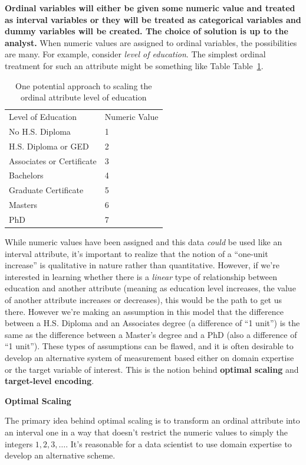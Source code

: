 \documentclass[
  letterpaper,
  DIV=11,
  numbers=noendperiod]{scrreprt}
\begin{document}
\textbf{Ordinal variables will either be given some numeric value and
treated as interval variables or they will be treated as categorical
variables and dummy variables will be created. The choice of solution is
up to the analyst.} When numeric values are assigned to ordinal
variables, the possibilities are many. For example, consider \emph{level
of education}. The simplest ordinal treatment for such an attribute
might be something like Table Table~\ref{tbl-educationint}.

\hypertarget{tbl-educationint}{}
\begin{longtable}[]{@{}ll@{}}
\caption{\label{tbl-educationint}One potential approach to scaling the
ordinal attribute level of education}\tabularnewline
\toprule()
\endhead
Level of Education & Numeric Value \\
No H.S. Diploma & 1 \\
H.S. Diploma or GED & 2 \\
Associates or Certificate & 3 \\
Bachelors & 4 \\
Graduate Certificate & 5 \\
Masters & 6 \\
PhD & 7 \\
\bottomrule()
\end{longtable}

While numeric values have been assigned and this data \emph{could} be
used like an interval attribute, it's important to realize that the
notion of a ``one-unit increase'' is qualitative in nature rather than
quantitative. However, if we're interested in learning whether there is
a \emph{linear} type of relationship between education and another
attribute (meaning as education level increases, the value of another
attribute increases or decreases), this would be the path to get us
there. However we're making an assumption in this model that the
difference between a H.S. Diploma and an Associates degree (a difference
of ``1 unit'') is the same as the difference between a Master's degree
and a PhD (also a difference of ``1 unit''). These types of assumptions
can be flawed, and it is often desirable to develop an alternative
system of measurement based either on domain expertise or the target
variable of interest. This is the notion behind \textbf{optimal scaling}
and \textbf{target-level encoding}.

\textbf{Optimal Scaling}

The primary idea behind optimal scaling is to transform an ordinal
attribute into an interval one in a way that doesn't restrict the
numeric values to simply the integers \(1,2,3, \dots\). It's reasonable
for a data scientist to use domain expertise to develop an alternative
scheme.
\end{document}
